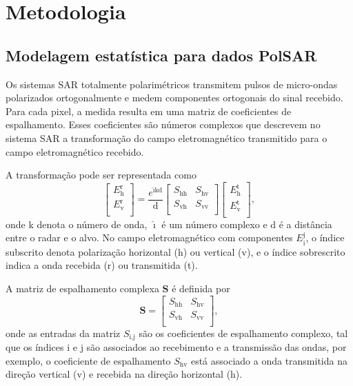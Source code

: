 \chapter{Metodologia}\label{metodologia}

\section{Modelagem estatística para dados PolSAR}\label{cap_acf_sec1}
Os sistemas SAR totalmente polarimétricos transmitem pulsos de micro-ondas polarizados ortogonalmente e medem componentes ortogonais do sinal recebido. Para cada pixel, a medida resulta em uma matriz de coeficientes de espalhamento. Esses coeficientes são números complexos que descrevem no sistema SAR a transformação do campo eletromagnético transmitido para o campo eletromagnético recebido.

A transformação pode ser representada como
\begin{equation*}
 \left[
\begin{array}{c}
	E_\text{h}^\text{r}   \\
	E_\text{v}^\text{r}    \\
\end{array}
\right]
 = \frac{e^{\hat{\imath} \text{kd}}}{\text{d}}\left[
\begin{array}{cc}
	S_{\text{hh}}   & S_{\text{hv}}   \\
	S_{\text{vh}}   & S_{\text{vv}}   \\
\end{array}
\right]
 \left[
\begin{array}{c}
	E_\text{h}^\text{t}   \\
	E_\text{v}^\text{t}   \\
\end{array}
\right],
\end{equation*}
onde k denota o número de onda, $\hat{\imath}$ é um número complexo e d é a distância entre o radar e o alvo. No campo eletromagnético com componentes $E_\text{i}^\text{j}$, o índice subscrito denota polarização horizontal (h) ou vertical (v), e o índice sobrescrito indica a onda recebida (r) ou transmitida (t). 

A matriz de espalhamento complexa $\mathbf{S}$ é definida por
\begin{equation}\label{matriz_de_espalhamento}
\mathbf{S} = \left[
\begin{array}{cc}
	S_{\text{hh}}   & S_{\text{hv}}   \\
	S_{\text{vh}}   & S_{\text{vv}}   \\
\end{array}
\right],
\end{equation}
onde as entradas da matriz $S_{\text{i,j}}$ são os coeficientes de espalhamento complexo, tal que os índices i e j são associados ao  recebimento e a transmissão das ondas, por exemplo, o coeficiente de espalhamento $S_{\text{hv}}$ está associado a onda transmitida na direção vertical (v) e recebida na direção horizontal (h).

